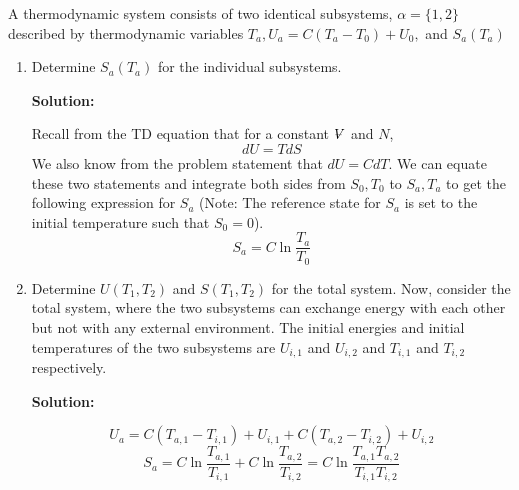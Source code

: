 \documentclass[10pt]{article}
\newenvironment{Solution}
    {\textbf{Solution:}
    
    \vspace{5mm}
    \begin{tcolorbox}
    }
    {
    \end{tcolorbox}
    \vspace{5mm}
    }
\newcommand{\vol}{{\ooalign{\hfil$V$\hfil\cr\kern0.08em--\hfil\cr}}}
\begin{document}
A thermodynamic system consists of two identical subsystems, $\alpha=\{1,2\}$ described by thermodynamic variables $T_{a}, U_{a}=C\left(T_{a}-T_{0}\right)+U_{0},$ and $S_{a}\left(T_{a}\right)$

\begin{enumerate}

\item Determine $S_{a}\left(T_{a}\right)$ for the individual subsystems.

\begin{Solution}
Recall from the TD equation that for a constant $\vol$ and $N$,
\begin{equation}\label{dutds}
    dU = T dS
\end{equation}
We also know from the problem statement that $dU = CdT$. We can equate these two statements and integrate both sides from $S_0, T_0$ to $S_a, T_a$ to get the following expression for $S_a$ (Note: The reference state for $S_a$ is set to the initial temperature such that $S_0 = 0$).
\begin{equation}
\boxed{
    S_a = C \ln{\frac{T_a}{T_0}}
    }
\end{equation}

\end{Solution}

\item Determine $U\left(T_{1}, T_{2}\right)$ and $S\left(T_{1}, T_{2}\right)$ for the total system.
Now, consider the total system, where the two subsystems can exchange energy with each other but not with any external environment. The initial energies and initial temperatures of the two subsystems are $U_{i, 1}$ and $U_{i, 2}$ and $T_{i, 1}$ and $T_{i, 2}$ respectively.

\begin{Solution}
\begin{equation}
    \boxed{
    U_{a} = C \left(T_{a,1}-T_{i,1}\right)+U_{i,1} + C \left(T_{a,2}-T_{i,2}\right)+U_{i,2}
    }
\end{equation}
\begin{equation}
\boxed{
    S_a = C \ln{\frac{T_{a,1}}{T_{i,1}}} + C \ln{\frac{T_{a,2}}{T_{i,2}}}
    } = \boxed{
    C \ln{\frac{T_{a,1}T_{a,2}}{T_{i,1}T_{i,2}}}}
\end{equation}
\end{Solution}



\end{enumerate}
\end{document}
